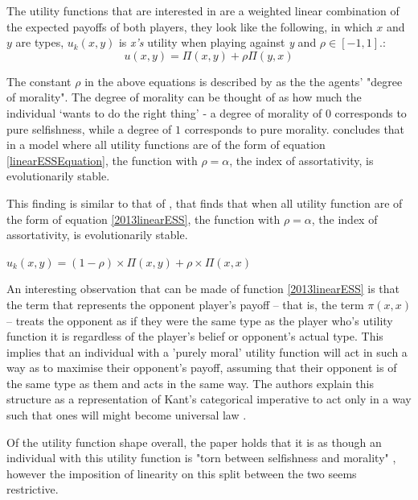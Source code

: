\documentclass[11pt]{book}
\newcommand*{\np}{\par\noindent\newline}
\begin{document}
\np The utility functions that \citet{alger_generalization_2012} are interested in are a weighted linear combination of the expected payoffs of both players, they look like the following, in which $x$ and $y$ are types, $u_k(x, y)$ is \textit{x's} utility when playing against \textit{y} and $\rho \in [-1, 1]$.:
\begin{equation}
	\label{linearESSEquation}
	u(x, y) = \Pi(x,y) + \rho\Pi(y,x)
\end{equation}

\noindent The constant $\rho$ in the above equations is described by \citet{alger_homo_2013} as the the agents' "degree of morality". 
The degree of morality can be thought of as how much the individual `wants to do the right thing' - a degree of morality of $0$ corresponds to pure selfishness, while a degree of $1$ corresponds to pure morality. 
\citet{alger_generalization_2012} concludes that in a model where all utility functions are of the form of equation \ref{linearESSEquation}, the function with $\rho = \alpha$, the index of assortativity, is evolutionarily stable.

\np This finding is similar to that of \citet{alger_homo_2013}, that finds that when all utility function are of the form of equation \ref{2013linearESS}, the function with $\rho = \alpha$, the index of assortativity, is evolutionarily stable.
\begin{center}
	\label{2013linearESS}
	$u_k(x, y) = (1 - \rho) \times \Pi(x, y) + \rho \times \Pi(x, x)$
\end{center}

\np An interesting observation that can be made of function \ref{2013linearESS} is that the term that represents the opponent player's payoff -- that is, the term $\pi(x,x)$ -- treats the
opponent as if they were the same type as the player who's utility function it is regardless of the player's belief or opponent's actual type. This implies that an individual with a 'purely moral' utility function will act in such a way as to maximise their opponent's payoff, assuming that their opponent is of the same type as them and acts in the same way. The authors explain this structure as a representation of Kant's categorical imperative to act only in a way such that ones will might become universal law \citep{kant_groundwork_1775}.

\np Of the utility function shape overall, the paper holds that it is as though an individual with this utility function is
 "torn between selfishness and morality" \citep[~p. 2276]{alger_homo_2013}, 
 however the imposition of linearity on this split between the two seems restrictive. 
 
\end{document}
